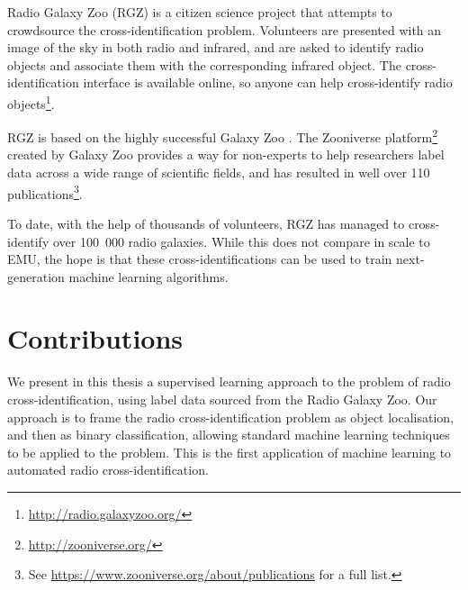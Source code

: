 

Radio Galaxy Zoo (RGZ) \citep{banfield15} is a citizen science project that
attempts to crowdsource the cross-identification problem. Volunteers are
presented with an image of the sky in both radio and infrared, and are asked to
identify radio objects and associate them with the corresponding infrared
object. The cross-identification interface is available online, so anyone can
help cross-identify radio objects\footnote{\url{http://radio.galaxyzoo.org/}}.

RGZ is based on the highly successful Galaxy Zoo \citep{lintott08, lintott11}.
The Zooniverse platform\footnote{\url{http://zooniverse.org/}} created by Galaxy
Zoo provides a way for non-experts to help researchers label data across a wide
range of scientific fields, and has resulted in well over 110
publications\footnote{See \url{https://www.zooniverse.org/about/publications}
for a full list.}.

To date, with the help of thousands of volunteers, RGZ has managed to
cross-identify over 100~000 radio galaxies. While this does not compare in scale
to EMU, the hope is that these cross-identifications can be used to train
next-generation machine learning algorithms.

\section{Contributions}
\label{sec:contributions}

  We present in this thesis a supervised learning approach to the problem of
  radio cross-identification, using label data sourced from the Radio Galaxy
  Zoo. Our approach is to frame the radio cross-identification problem as object
  localisation, and then as binary classification, allowing standard machine
  learning techniques to be applied to the problem. This is the first
  application of machine learning to automated radio cross-identification.

